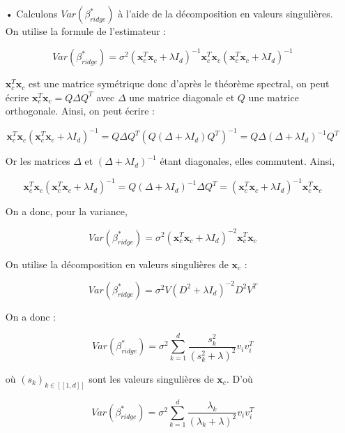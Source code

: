 \documentclass[a4paper, 10pt]{article}
\begin{document}
\begin{itemize}
	\item[•] Calculons $Var \left( \beta_{ridge}^{*} \right)$ à l'aide de la décomposition en valeurs singulières. On utilise la formule de l'estimateur : 
	
\[ Var \left( \beta_{ridge}^{*} \right) = \sigma^{2} \left( \textbf{x}_{c}^{T}\textbf{x}_{c} + \lambda I_{d} \right)^{-1} \textbf{x}_{c}^{T}\textbf{x}_{c} \left( \textbf{x}_{c}^{T}\textbf{x}_{c} + \lambda I_{d} \right)^{-1} \]

$\textbf{x}_{c}^{T}\textbf{x}_{c}$ est une matrice symétrique donc d'après le théorème spectral, on peut écrire $\textbf{x}_{c}^{T}\textbf{x}_{c} = Q \Delta Q^{T}$ avec $\Delta$ une matrice diagonale et $Q$ une matrice orthogonale. Ainsi, on peut écrire :

\[ \textbf{x}_{c}^{T}\textbf{x}_{c} \left( \textbf{x}_{c}^{T}\textbf{x}_{c} + \lambda I_{d} \right)^{-1} = Q \Delta Q^{T} \left( Q \left( \Delta + \lambda I_{d} \right) Q^{T} \right)^{-1} = Q \Delta \left( \Delta + \lambda I_{d} \right)^{-1} Q^{T} \]

Or les matrices $\Delta$ et $\left( \Delta + \lambda I_{d} \right)^{-1}$ étant diagonales, elles commutent. Ainsi,

\[ \textbf{x}_{c}^{T}\textbf{x}_{c} \left( \textbf{x}_{c}^{T}\textbf{x}_{c} + \lambda I_{d} \right)^{-1} = Q \left( \Delta + \lambda I_{d} \right)^{-1} \Delta Q^{T} = \left( \textbf{x}_{c}^{T}\textbf{x}_{c} + \lambda I_{d} \right)^{-1} \textbf{x}_{c}^{T}\textbf{x}_{c} \]

On a donc, pour la variance, 

\[ Var \left( \beta_{ridge}^{*} \right) = \sigma^{2} \left( \textbf{x}_{c}^{T}\textbf{x}_{c} + \lambda I_{d} \right)^{-2} \textbf{x}_{c}^{T}\textbf{x}_{c} \]

On utilise la décomposition en valeurs singulières de $\textbf{x}_{c}$ :

\[ Var \left( \beta_{ridge}^{*} \right) = \sigma^{2} V \left( D^{2} + \lambda I_{d} \right)^{-2} D^{2}V^{T} \]

On a donc :

\[ Var \left( \beta_{ridge}^{*} \right) = \sigma^{2} \sum_{k = 1}^{d} \frac{s_{k}^{2}}{\left( s_{k}^{2} + \lambda \right)^{2}} v_{i}v_{i}^{T} \]

où $\left( s_{k} \right)_{k \in [\![ 1, d ]\!]}$ sont les valeurs singulières de $\textbf{x}_{c}$. D'où 

\[ Var \left( \beta_{ridge}^{*} \right) = \sigma^{2} \sum_{k = 1}^{d} \frac{\lambda_{k}}{\left( \lambda_{k} + \lambda \right)^{2}} v_{i}v_{i}^{T} \]


\end{itemize}
\end{document}
